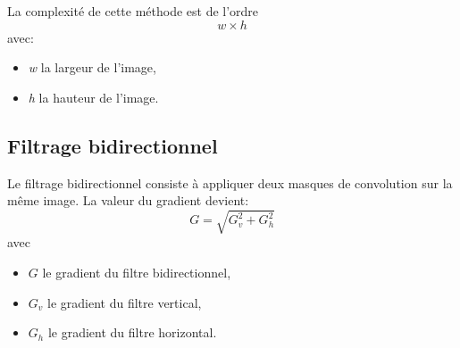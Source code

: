 \documentclass[11pt]{article}
\begin{document}
	La complexité de cette méthode est de l’ordre \[w \times h\] avec:
	\begin{itemize}
		\item \textit{w} la largeur de l’image,
		\item \textit{h} la hauteur de l’image. 
	\end{itemize}


	\subsection{Filtrage bidirectionnel}

	Le filtrage bidirectionnel consiste à appliquer deux masques de convolution sur la même image.
	La valeur du gradient devient: 
	\[G = \sqrt{G_{v}^2 + G_{h}^2}\]
	avec 
	\begin{itemize}
		\item $G$ le gradient du filtre bidirectionnel,
		\item $G_{v}$ le gradient du filtre vertical,
		\item $G_{h}$ le gradient du filtre horizontal.
	\end{itemize}
            
\end{document}
